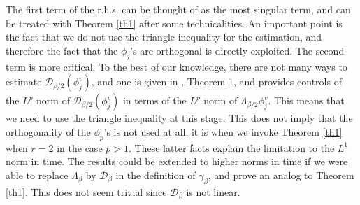 \documentclass[12pt]{article}
\newcommand{\calD}{\mathcal D}
\begin{document}
The first term of the r.h.s. can be thought of as the most singular term, and can be treated with Theorem \ref{th1} after some technicalities. An important point is the fact that we do not use the triangle inequality for the estimation, and therefore the fact that the $\phi_j$'s are orthogonal is directly exploited. The second term is more critical. To the best of our knowledge, there are not many ways to estimate $\calD_{\beta/2}(\phi^v_j)$, and one is given in \cite{stein1}, Theorem 1, and provides controls of the $L^p$ norm of $\calD_{\beta/2}(\phi_j^v)$ in terms of the $L^p$ norm of $\Lambda_{\beta/2}\phi^v_j$. This means that we need to use the triangle inequality at this stage. This does not imply that the orthogonality of the $\phi_p$'s is not used at all, it is when we invoke Theorem \ref{th1} when $r=2$ in the case $p>1$. These latter facts explain the limitation to the $L^1$ norm in time. The results could be extended to higher norms in time if we were able to replace $\Lambda_\beta$ by $\calD_{\beta}$  in the definition of $\gamma_\beta$, and prove an analog to Theorem \ref{th1}. This does not seem trivial since $\calD_{\beta}$ is not linear.
\end{document}
